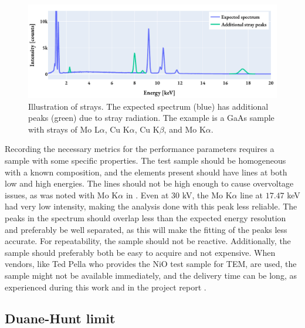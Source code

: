 \begin{figure}[htp]
    \centering
    \includegraphics[width=0.8\linewidth]{figures/pp_strays.pdf}
    \caption{
        Illustration of strays.
        The expected spectrum (blue) has additional peaks (green) due to stray radiation.
        The example is a GaAs sample with strays of Mo L$\alpha$, Cu K$\alpha$, Cu K$\beta$, and Mo K$\alpha$.
    }
    \label{fig:theory:eds_performance:overview:strays}
\end{figure}




Recording the necessary metrics for the performance parameters requires a sample with some specific properties.
The test sample should be homogeneous with a known composition, and the elements present should have lines at both low and high energies.
The lines should not be high enough to cause overvoltage issues, as was noted with Mo K$\alpha$ in \cite{project_report}.
Even at $30$ kV, the Mo K$\alpha$ line at $17.47$ keV had very low intensity, making the analysis done with this peak less reliable.
The peaks in the spectrum should overlap less than the expected energy resolution and preferably be well separated, as this will make the fitting of the peaks less accurate.
For repeatability, the sample should not be reactive.
Additionally, the sample should preferably both be easy to acquire and not expensive.
When vendors, like Ted Pella who provides the NiO test sample for TEM, are used, the sample might not be available immediately, and the delivery time can be long, as experienced during this work and in the project report \cite{project_report}.







\subsection{Duane-Hunt limit}
\label{theory:eds_performance:duanehunt}

